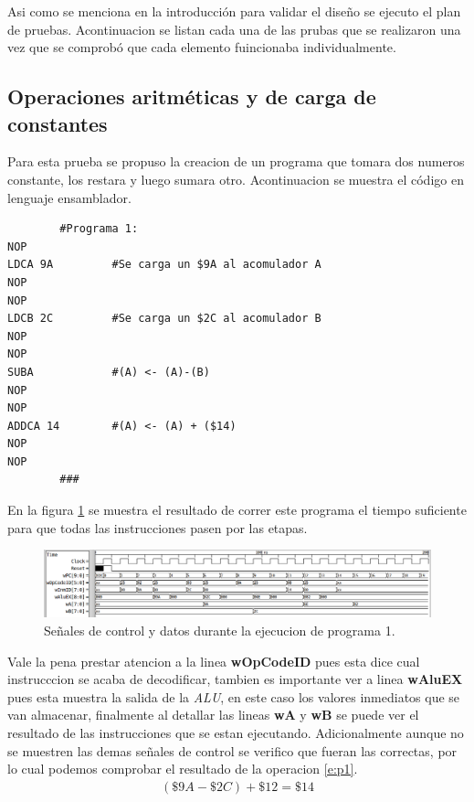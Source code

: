 \documentclass[paper=letter, fontsize=12pt]{article}
\begin{document}
Asi como se menciona en la introducción para validar el diseño se ejecuto el plan de pruebas. Acontinuacion se listan cada una de las prubas que se realizaron una vez que se comprobó que cada elemento fuincionaba individualmente.

\subsection{Operaciones aritméticas y de carga de constantes}
Para esta prueba se propuso la creacion de un programa que tomara dos numeros constante, los restara y luego sumara otro. Acontinuacion se muestra el código en lenguaje ensamblador.

\begin{lstlisting}
		#Programa 1:
NOP
LDCA 9A			#Se carga un $9A al acomulador A
NOP
NOP
LDCB 2C			#Se carga un $2C al acomulador B
NOP
NOP
SUBA			#(A) <- (A)-(B)
NOP
NOP
ADDCA 14		#(A) <- (A) + ($14)
NOP
NOP
		###
\end{lstlisting}

En la figura \ref{i:p1} se muestra el resultado de correr este programa el tiempo suficiente para que todas las instrucciones pasen por las etapas.\\

\begin{figure}[hbtp]
\centering
\includegraphics[width=1\linewidth]{../test/Prog1.png}
\caption{Señales de control y datos durante la ejecucion de programa 1.}
\label{i:p1}
\end{figure}

Vale la pena prestar atencion a la linea \textbf{wOpCodeID} pues esta dice cual instrucccion se acaba de decodificar, tambien es importante ver a linea \textbf{wAluEX} pues esta muestra la salida de la \textit{ALU}, en este caso los valores inmediatos que se van almacenar, finalmente al detallar las lineas \textbf{wA} y \textbf{wB} se puede ver el resultado de las instrucciones que se estan ejecutando. Adicionalmente aunque no se muestren las demas señales de control se verifico que fueran las correctas, por lo cual podemos comprobar el resultado de la operacion \ref{e:p1}.\\

\begin{align} 
\label{e:p1}
(\$9A - \$2C) + \$12 = \$14
\end{align}
\end{document}
